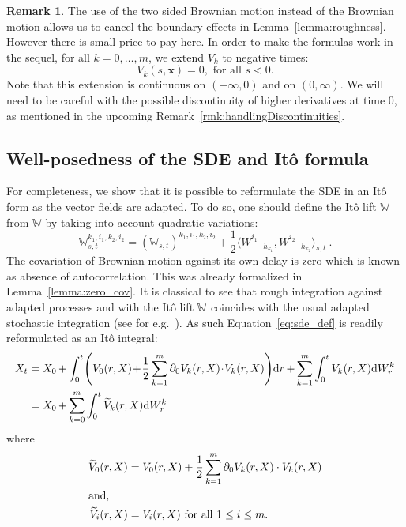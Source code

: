 \documentclass[11pt]{article}
\theoremstyle{definition}
\newtheorem{rema}[theo]{Remark}
\numberwithin{equation}{section}
\numberwithin{figure}{section}
\numberwithin{table}{section}
\DeclareMathOperator{\Ito}{It\hat{o}}
\newcommand*\half{\frac{1}{2}}
\newcommand*\W{\mathbb{W}}
\newcommand*\xb{\mathbf{x}}
\newcommand*{\mk}{\mkern -1mu}
\newcommand*{\dd}{\mathrm{d}}
\newcommand*{\dW}{\dd W}
\newcommand*{\dr}{\dd r}
\begin{document}
\begin{rema}\label{rmk-extension}
The use of the two sided Brownian motion instead of the Brownian motion allows us to cancel the boundary effects in Lemma~\ref{lemma:roughness}. However there is small price to pay here. In order to make the formulas work in the sequel, for all $k=0,\dots,m$, we extend $V_k$ to negative times:
\[
V_k(s,\xb)=0,\text{ for all }s<0.
\]
Note that this extension is continuous on $(-\infty,0)$ and on $(0,\infty)$. We will need to be careful with the possible discontinuity of higher derivatives at time $0$, as mentioned in the upcoming Remark~\ref{rmk:handlingDiscontinuities}.
\end{rema}

\subsection{Well-posedness of the SDE and Itô formula}\label{subsection:wellposedness}
For completeness, we show that it is possible to reformulate the SDE in an Itô form as the vector fields are adapted. To do so, one should define the Itô lift $\W^{\Ito}$ from $\W$ by taking into account quadratic variations:
\[
\W_{s,t}^{k_1, i_1, k_2, i_2} = \left(\W^{\Ito}_{s,t} \right)^{k_1, i_1, k_2, i_2}
+ \half \langle W^{i_1}_{\cdot-h_{k_1}}, W^{i_2}_{\cdot-h_{k_2}} \rangle_{s,t} \ .
\]
The covariation of Brownian motion against its own delay is zero which is known as absence of autocorrelation. This was already formalized in Lemma~\ref{lemma:zero_cov}. It is classical to see that rough integration against adapted processes and with the Itô lift $\W^{\Ito}$ coincides with the usual adapted stochastic integration (see for e.g.~\cite[Proposition~5.1]{FH14}). As such Equation~\eqref{eq:sde_def} is readily reformulated as an Itô integral:
\begin{equation}\label{eq:sde_def_ito}
\begin{aligned}
X_t  &= X_0 \mk+\mk \int_0^t \!\left(V_0(r,X) \!+\! \half \sum_{k=1}^m \partial_0 V_k(r,X) \!\cdot\! V_k(r,X) \right)\!\dr \mk+\mk \sum_{k=1}^m \int_0^t V_k(r,X) \dW^k_r \\
&= X_0 \mk+\mk \sum_{k=0}^m \int_0^t \widetilde{V}_k(r,X) \dW^k_r \, 
\end{aligned}
\end{equation}
where
\begin{align*}
\widetilde V_0(r,X)&=V_0(r,X) + \half \sum_{k=1}^m \partial_0 V_k(r,X) \cdot V_k(r,X)\\ 
\intertext{and,} 
\widetilde V_i(r,X)&=V_i(r,X)\text{ for all } 1 \leq i \leq m.
\end{align*}
\end{document}
